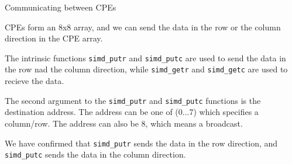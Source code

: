 Communicating between CPEs

CPEs form an 8x8 array, and
we can send the data in the row or the column direction in the CPE array.

The intrinsic functions
\verb`simd_putr` and
\verb`simd_putc` are used to send the data in the row nad the column direction, while
\verb`simd_getr` and
\verb`simd_getc` are used to recieve the data.

The second argument to the
\verb`simd_putr` and
\verb`simd_putc` functions
is the destination address. The address can be one of
(0...7) which specifies a column/row. The address can also be 8,
which means a broadcast.



We have confirmed that
\verb`simd_putr` sends the data in the row direction, and
\verb`simd_putc` sends the data in the column direction.
